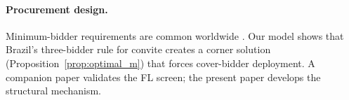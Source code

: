 \paragraph{Procurement design.}
Minimum-bidder requirements are common worldwide
\citep{szymanski2006impact, decarolis2018buyers}. Our model shows
that Brazil's three-bidder rule for convite creates a corner solution
(Proposition~\ref{prop:optimal_m}) that forces cover-bidder
deployment. A companion paper \citep{genicolomartins2026screening}
validates the FL screen; the present paper develops the structural
mechanism.
